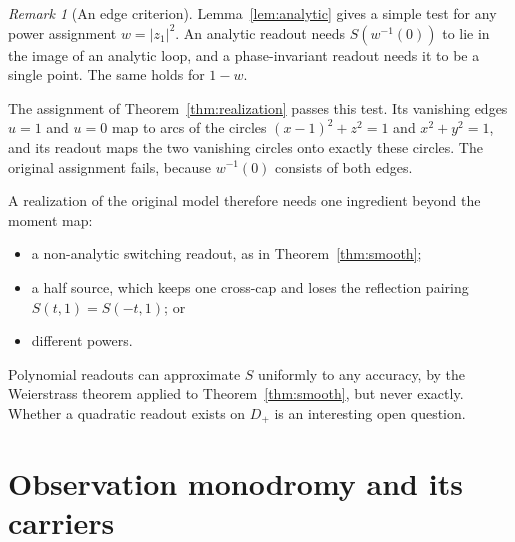 \documentclass[11pt]{article}
\theoremstyle{definition}\newtheorem{definition}[theorem]{Definition}
\theoremstyle{remark}\newtheorem{remark}[theorem]{Remark}
\begin{document}
\begin{remark}[An edge criterion]\label{rem:data}
Lemma~\ref{lem:analytic} gives a simple test for any power assignment
$w=|z_1|^2$. An analytic readout needs $S(w^{-1}(0))$ to lie in the image of an
analytic loop, and a phase-invariant readout needs it to be a single point. The
same holds for $1-w$.

The assignment of Theorem~\ref{thm:realization} passes this test. Its vanishing
edges $u=1$ and $u=0$ map to arcs of the circles $(x-1)^2+z^2=1$ and
$x^2+y^2=1$, and its readout maps the two vanishing circles onto exactly these
circles. The original assignment fails, because $w^{-1}(0)$ consists of both
edges.

A realization of the original model therefore needs one ingredient beyond
the moment map:
\begin{itemize}
\item a non-analytic switching readout, as in Theorem~\ref{thm:smooth};
\item a half source, which keeps one cross-cap and loses the reflection pairing
$S(t,1)=S(-t,1)$; or
\item different powers.
\end{itemize}
Polynomial readouts can approximate $S$ uniformly to any accuracy, by the
Weierstrass theorem applied to Theorem~\ref{thm:smooth}, but never exactly.
Whether a quadratic readout exists on $D_+$ is an interesting open question.
\end{remark}

\section{Observation monodromy and its carriers}\label{sec:monodromy}
\end{document}
